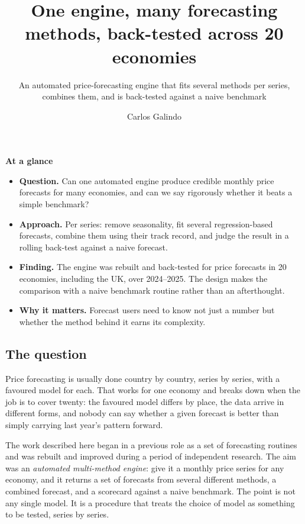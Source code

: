 \documentclass[
  british,
  a4paper,
]{article}
\title{One engine, many forecasting methods, back-tested across 20
economies}
\subtitle{An automated price-forecasting engine that fits several
methods per series, combines them, and is back-tested against a naive
benchmark}
\author{Carlos Galindo}
\date{}
\providecommand{\tightlist}{%
  \setlength{\itemsep}{0pt}\setlength{\parskip}{0pt}}
\begin{document}
\maketitle


\begin{tcolorbox}[enhanced jigsaw, arc=.35mm, bottomrule=.15mm, breakable, colback=white, colframe=quarto-callout-note-color-frame, left=2mm, leftrule=.75mm, opacityback=0, rightrule=.15mm, toprule=.15mm]

\vspace{-3mm}\textbf{At a glance}\vspace{3mm}

\begin{itemize}
\tightlist
\item
  \textbf{Question.} Can one automated engine produce credible monthly
  price forecasts for many economies, and can we say rigorously whether
  it beats a simple benchmark?
\item
  \textbf{Approach.} Per series: remove seasonality, fit several
  regression-based forecasts, combine them using their track record, and
  judge the result in a rolling back-test against a naive forecast.
\item
  \textbf{Finding.} The engine was rebuilt and back-tested for price
  forecasts in 20 economies, including the UK, over 2024--2025. The
  design makes the comparison with a naive benchmark routine rather than
  an afterthought.
\item
  \textbf{Why it matters.} Forecast users need to know not just a number
  but whether the method behind it earns its complexity.
\end{itemize}

\end{tcolorbox}

\subsection{The question}\label{the-question}

Price forecasting is usually done country by country, series by series,
with a favoured model for each. That works for one economy and breaks
down when the job is to cover twenty: the favoured model differs by
place, the data arrive in different forms, and nobody can say whether a
given forecast is better than simply carrying last year's pattern
forward.

The work described here began in a previous role as a set of forecasting
routines and was rebuilt and improved during a period of independent
research. The aim was an \emph{automated multi-method engine}: give it a
monthly price series for any economy, and it returns a set of forecasts
from several different methods, a combined forecast, and a scorecard
against a naive benchmark. The point is not any single model. It is a
procedure that treats the choice of model as something to be tested,
series by series.
\end{document}
